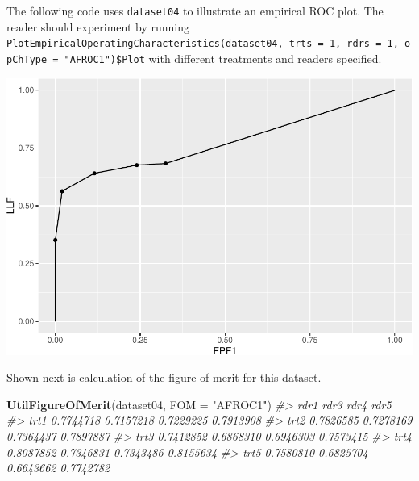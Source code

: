 \documentclass[
]{book}
\newenvironment{Shaded}{\begin{snugshade}}{\end{snugshade}}
\newcommand{\CommentTok}[1]{\textcolor[rgb]{0.56,0.35,0.01}{\textit{#1}}}
\newcommand{\DataTypeTok}[1]{\textcolor[rgb]{0.13,0.29,0.53}{#1}}
\newcommand{\DecValTok}[1]{\textcolor[rgb]{0.00,0.00,0.81}{#1}}
\newcommand{\KeywordTok}[1]{\textcolor[rgb]{0.13,0.29,0.53}{\textbf{#1}}}
\newcommand{\NormalTok}[1]{#1}
\newcommand{\OperatorTok}[1]{\textcolor[rgb]{0.81,0.36,0.00}{\textbf{#1}}}
\newcommand{\StringTok}[1]{\textcolor[rgb]{0.31,0.60,0.02}{#1}}
\begin{document}
The following code uses \texttt{dataset04} to illustrate an empirical ROC plot. The reader should experiment by running \texttt{PlotEmpiricalOperatingCharacteristics(dataset04,\ trts\ =\ 1,\ rdrs\ =\ 1,\ opChType\ =\ "AFROC1")\$Plot} with different treatments and readers specified.

\begin{Shaded}
\end{Shaded}

\includegraphics{03-empirical_files/figure-latex/unnamed-chunk-13-1.pdf}

Shown next is calculation of the figure of merit for this dataset.

\begin{Shaded}
\begin{Highlighting}[]
\KeywordTok{UtilFigureOfMerit}\NormalTok{(dataset04, }\DataTypeTok{FOM =} \StringTok{"AFROC1"}\NormalTok{)}
\CommentTok{#>           rdr1      rdr3      rdr4      rdr5}
\CommentTok{#> trt1 0.7744718 0.7157218 0.7229225 0.7913908}
\CommentTok{#> trt2 0.7826585 0.7278169 0.7364437 0.7897887}
\CommentTok{#> trt3 0.7412852 0.6868310 0.6946303 0.7573415}
\CommentTok{#> trt4 0.8087852 0.7346831 0.7343486 0.8155634}
\CommentTok{#> trt5 0.7580810 0.6825704 0.6643662 0.7742782}
\end{Highlighting}
\end{Shaded}
\end{document}
